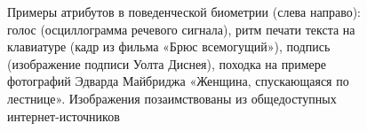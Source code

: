 \documentclass[12pt]{book}
\begin{document}
\begin{figure}[]
\caption{Примеры атрибутов в поведенческой биометрии (слева направо): голос (осциллограмма речевого сигнала), ритм печати текста на клавиатуре (кадр из фильма «Брюс всемогущий»), подпись (изображение подписи Уолта Диснея), походка на примере фотографий Эдварда Майбриджа «Женщина, спускающаяся по лестнице». Изображения позаимствованы из общедоступных интернет-источников}
\label{fig:figure_1_5}
\end{figure}
\end{document}
